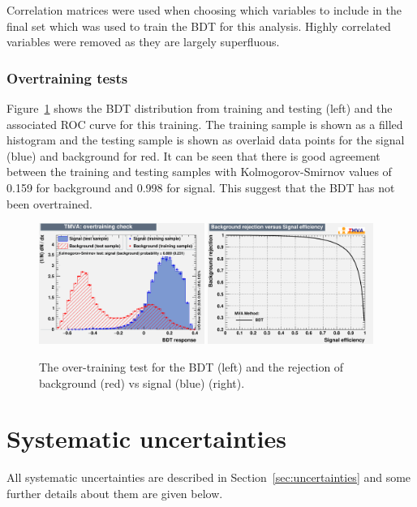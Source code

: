 Correlation matrices were used when choosing which variables to include in the final set which was used to train the BDT for this analysis. Highly correlated variables were removed as they are largely superfluous.

\subsubsection{Overtraining tests}

Figure~\ref{fig:ROC} shows the BDT distribution from training and testing (left) and the associated ROC curve for this training. The training sample is shown as a filled histogram and the testing sample is shown as overlaid data points for the signal \tttt (blue) and background \ttbar for red. It can be seen that there is good agreement between the training and testing samples with Kolmogorov-Smirnov values of 0.159 for background and 0.998 for signal. This suggest that the BDT has not been overtrained.

\begin{figure}
    \includegraphics[width=0.48\textwidth]{images/Run2/overtrain_BDT.pdf}
    \includegraphics[width=0.48\textwidth]{images/Run2/rejBvsS.pdf}
    \caption{The over-training test for the BDT (left) and the rejection of background \ttbar (red) vs signal \tttt (blue) (right).}
    \label{fig:ROC}
\end{figure}


\section{Systematic uncertainties}
\label{sec:uncertainties13}
All systematic uncertainties are described in Section~\ref{sec:uncertainties} and some further details about them are given below.

